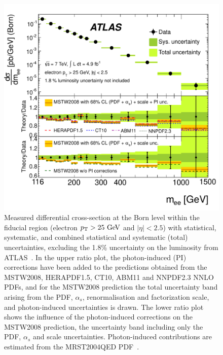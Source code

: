 \begin{figure}[p]
    \centering
    \includegraphics[height=0.3\textheight]{figures/ss-inclboson-drellyan-atlas7tev}
    \caption{Measured differential cross-section at the Born level within the
    fiducial region (electron $\pt > 25 \GeV$ and $|\eta| < 2.5$) with statistical,
     systematic, and combined statistical and systematic (total) uncertainties,
     excluding the 1.8\% uncertainty on the luminosity from ATLAS~\cite{Aad:2013iua}.
     In the upper ratio plot, the photon-induced (PI)
     corrections have been added to the predictions obtained from the MSTW2008,
     HERAPDF1.5, CT10, ABM11 and NNPDF2.3 NNLO PDFs, and for the MSTW2008 prediction
     the total uncertainty band arising from the PDF, $\alpha_s$, renormalisation
     and factorization scale, and photon-induced uncertainties is drawn. The lower
     ratio plot shows the influence of the photon-induced corrections on the
     MSTW2008 prediction, the uncertainty band including only the PDF, $\alpha_s$
     and scale uncertainties. Photon-induced contributions are estimated from the MRST2004QED PDF~\cite{Martin:2004dh}.}
    \label{fig:ss-inclboson-drellyan-atlas7tev}
\end{figure}


